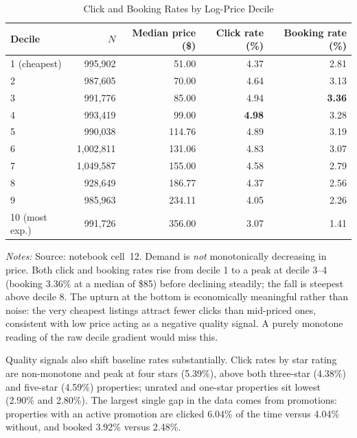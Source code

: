 \documentclass[11pt]{article}
\begin{document}
\begin{table}[htbp]
  \centering
  \caption{Click and Booking Rates by Log-Price Decile}
  \label{tab:deciles}
  \small
  \begin{tabular}{lrrrr}
    \toprule
    Decile & $N$ & Median price (\$) & Click rate (\%) & Booking rate (\%) \\
    \midrule
    1 (cheapest)   &   995,902 &  51.00 & 4.37 & 2.81 \\
    2              &   987,605 &  70.00 & 4.64 & 3.13 \\
    3              &   991,776 &  85.00 & 4.94 & \textbf{3.36} \\
    4              &   993,419 &  99.00 & \textbf{4.98} & 3.28 \\
    5              &   990,038 & 114.76 & 4.89 & 3.19 \\
    6              & 1,002,811 & 131.06 & 4.83 & 3.07 \\
    7              & 1,049,587 & 155.00 & 4.58 & 2.79 \\
    8              &   928,649 & 186.77 & 4.37 & 2.56 \\
    9              &   985,963 & 234.11 & 4.05 & 2.26 \\
    10 (most exp.) &   991,726 & 356.00 & 3.07 & 1.41 \\
    \bottomrule
  \end{tabular}
  \vspace{0.6ex}
  \begin{minipage}{0.9\textwidth}
  \footnotesize \textit{Notes:} Source: notebook cell~12. Demand is
  \emph{not} monotonically decreasing in price. Both click and booking rates
  rise from decile 1 to a peak at decile 3--4 (booking 3.36\% at a median of
  \$85) before declining steadily; the fall is steepest above decile 8. The
  upturn at the bottom is economically meaningful rather than noise: the very
  cheapest listings attract fewer clicks than mid-priced ones, consistent with
  low price acting as a negative quality signal. A purely monotone reading of
  the raw decile gradient would miss this.
  \end{minipage}
\end{table}

Quality signals also shift baseline rates substantially. Click rates by star
rating are non-monotone and peak at four stars (5.39\%), above both three-star
(4.38\%) and five-star (4.59\%) properties; unrated and one-star properties sit
lowest (2.90\% and 2.80\%). The largest single gap in the data comes from
promotions: properties with an active promotion are clicked 6.04\% of the time
versus 4.04\% without, and booked 3.92\% versus 2.48\%.
\end{document}
